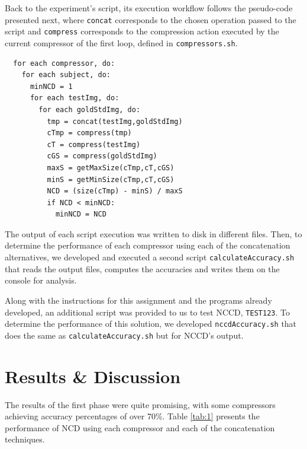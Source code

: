 \documentclass[12pt]{article}
\begin{document}
Back to the experiment's script, its execution workflow follows the pseudo-code presented next, where \texttt{concat} corresponds to the chosen operation passed 
to the script and \texttt{compress} corresponds to the compression action executed by the current compressor of the first loop, defined in \texttt{compressors.sh}.

\begin{verbatim}
  for each compressor, do:
    for each subject, do:
      minNCD = 1
      for each testImg, do:
        for each goldStdImg, do:
          tmp = concat(testImg,goldStdImg)
          cTmp = compress(tmp)
          cT = compress(testImg)
          cGS = compress(goldStdImg)
          maxS = getMaxSize(cTmp,cT,cGS)
          minS = getMinSize(cTmp,cT,cGS)
          NCD = (size(cTmp) - minS) / maxS
          if NCD < minNCD:
            minNCD = NCD
\end{verbatim}

\newpage
The output of each script execution was written to disk in different files.
Then, to determine the performance of each compressor using each of the concatenation alternatives, we developed and executed a second script 
\texttt{calculateAccuracy.sh} that reads the output files, computes the accuracies and writes them on the console for analysis. 

Along with the instructions for this assignment and the programs already developed, an additional script was provided to us to test NCCD, \texttt{TEST123}.
To determine the performance of this solution, we developed \texttt{nccdAccuracy.sh} that does the same as \texttt{calculateAccuracy.sh} but for NCCD's output.

\section{Results \& Discussion} %

The results of the first phase were quite promising, with some compressors achieving accuracy percentages of over 70\%.
Table \ref{tab:1} presents the performance of NCD using each compressor and each of the concatenation techniques.
\end{document}

